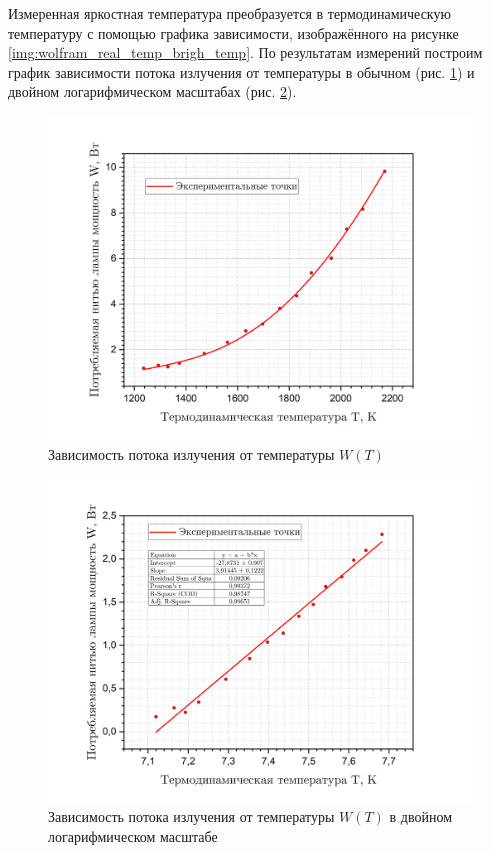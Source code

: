 \documentclass[a4paper, 12pt]{article}
\begin{document}
    Измеренная яркостная температура преобразуется в термодинамическую температуру с помощью графика зависимости, изображённого на рисунке \ref{img:wolfram_real_temp_brigh_temp}. По результатам измерений построим график зависимости потока излучения от температуры в обычном (рис. \ref{fig:wt}) и двойном логарифмическом масштабах (рис. \ref{fig:lnw_lnt}).
	
    \begin{figure}[H]
        \centering
        \includegraphics[width = 14 cm]{images/graph_W_T.png}
        \caption{Зависимость потока излучения от температуры $W(T)$}
        \label{fig:wt}
    \end{figure}

    \begin{figure}[H]
        \centering
        \includegraphics[width = 14 cm]{images/graph_ln_W_T.png}
        \caption{Зависимость потока излучения от температуры $W(T)$ в двойном логарифмическом масштабе}
        \label{fig:lnw_lnt}
    \end{figure}
	
\end{document}
